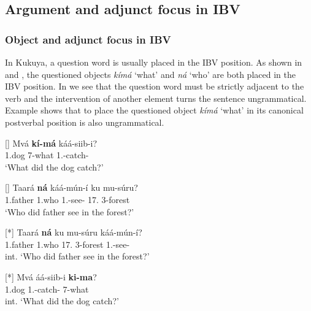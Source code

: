 \documentclass[output=paper,colorlinks,citecolor=brown,
]{langscibook}
\begin{document}
\subsection{Argument and adjunct focus in IBV}\label{teke:sec:3.1}
\subsubsection{Object and adjunct focus in IBV}\label{teke:sec:3.1.1}
In Kukuya, a question word is usually placed in the IBV position. As shown in  and , the questioned objects \textit{kímá} `what' and \textit{ná} `who' are both placed in the IBV position. In  we see that the question word must be strictly adjacent to the verb and the intervention of another element turns the sentence ungrammatical. Example  shows that to place the questioned object \textit{kímá} `what' in its canonical postverbal position is also ungrammatical.
\begin{exe}
    \ex \label{19}
    \begin{xlist}
\ex
[]{
\label{19a}
\gll
Mvá \textbf{kí-má} káá-siib-i?\\
1.dog 7-what 1\Sm{}.\Pst{}-catch-\Pst{}\\
\trans ‘What did the dog catch?’
}

\ex
[]{
\label{19b}
\gll
Taará \textbf{n\'{a}} káá-m\'{u}n-í ku mu-s\'{u}ru?\\
1.father 1.who 1\Sm{}.\Pst{}-see-\Pst{} 17.\Loc{} 3-forest\\
\trans ‘Who did father see in the forest?’
}

\ex
[*]{
\label{19c}
\gll
Taará \textbf{n\'{a}} ku mu-s\'{u}ru káá-m\'{u}n-í?\\
1.father 1.who 17.\Loc{} 3-forest 1\Sm{}.\Pst{}-see-\Pst{}\\
\trans int. ‘Who did father see in the forest?’
}

\ex
[*]{
\label{19d}
\gll
Mvá áá-siib-i \textbf{ki-ma}?\\
1.dog 1\Sm{}.\Pst{}-catch-\Pst{} 7-what\\
\trans int. ‘What did the dog catch?’
}

    \end{xlist}
\end{exe}
\end{document}
